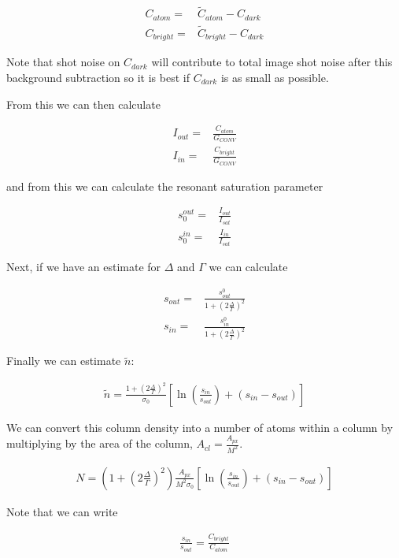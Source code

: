 \documentclass[12pt]{article}
\begin{document}
\begin{align}
C_{atom} =& \tilde{C}_{atom} - C_{dark}\\
C_{bright} =& \tilde{C}_{bright} - C_{dark}
\end{align}

Note that shot noise on $C_{dark}$ will contribute to total image shot noise after this background subtraction so it is best if $C_{dark}$ is as small as possible.

From this we can then calculate

\begin{align}
I_{out} =& \frac{C_{atom}}{G_{CONV}}\\
I_{in} =& \frac{C_{bright}}{G_{CONV}}
\end{align}

and from this we can calculate the resonant saturation parameter

\begin{align}
s_0^{out} =& \frac{I_{out}}{I_{sat}}\\
s_0^{in} =& \frac{I_{in}}{I_{sat}}
\end{align}

Next, if we have an estimate for $\Delta$ and $\Gamma$ we can calculate

\begin{align}
s_{out} =& \frac{s_{out}^0}{1+\left(2\frac{\Delta}{\Gamma}\right)^2}\\
s_{in} =& \frac{s_{in}^0}{1+\left(2\frac{\Delta}{\Gamma}\right)^2}
\end{align}

Finally we can estimate $\tilde{n}$:

\begin{align}
\tilde{n} = \frac{1 + \left(2\frac{\Delta}{\Gamma}\right)^2}{\sigma_0} \left[ \ln\left(\frac{s_{in}}{s_{out}}\right) + (s_{in} - s_{out})\right]
\end{align}

We can convert this column density into a number of atoms within a column by multiplying by the area of the column, $A_{cl} = \frac{A_{px}}{M^2}$.

\begin{align}
N = \left(1 + \left(2\frac{\Delta}{\Gamma}\right)^2\right) \frac{A_{px}}{M^2 \sigma_0}\left[ \ln\left(\frac{s_{in}}{s_{out}}\right) + (s_{in} - s_{out})\right]
\end{align}

Note that we can write

\begin{align}
\frac{s_{in}}{s_{out}} = \frac{C_{bright}}{C_{atom}}
\end{align}
\end{document}
